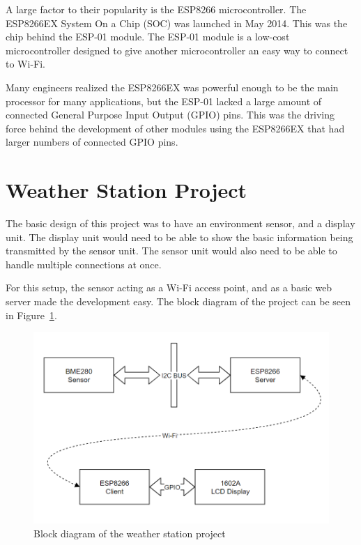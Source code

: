\documentclass[onecolumn, 12pt]{IEEEConf}
\begin{document}
        A large factor to their popularity is the ESP8266 microcontroller.
        The ESP8266EX System On a Chip (SOC) was launched in May 2014.\cite{Espressif_Milestones}
        This was the chip behind the ESP-01 module.
        The ESP-01 module is a low-cost microcontroller designed to give another microcontroller an 
        easy way to connect to Wi-Fi.

        Many engineers realized the ESP8266EX was powerful enough to be the main processor for many applications,
        but the ESP-01 lacked a large amount of connected General Purpose Input Output (GPIO) pins.
        This was the driving force behind the development of other modules using the ESP8266EX that had larger
        numbers of connected GPIO pins.

    \section{Weather Station Project}
        The basic design of this project was to have an environment sensor,
        and a display unit.
        The display unit would need to be able to show the basic information
        being transmitted by the sensor unit.
        The sensor unit would also need to be able to handle multiple connections at once.

        For this setup, the sensor acting as a Wi-Fi access point, and as a basic web server
        made the development easy. The block diagram of the project can be seen in Figure~\ref{fig:BlockDiagram}.
        
        \begin{figure}
            \centering
            \includegraphics[max width=\textwidth,keepaspectratio,scale=.6]{images/BlockDiagram.png}
            \caption{\label{fig:BlockDiagram}Block diagram of the weather station project}
        \end{figure}
\end{document}
